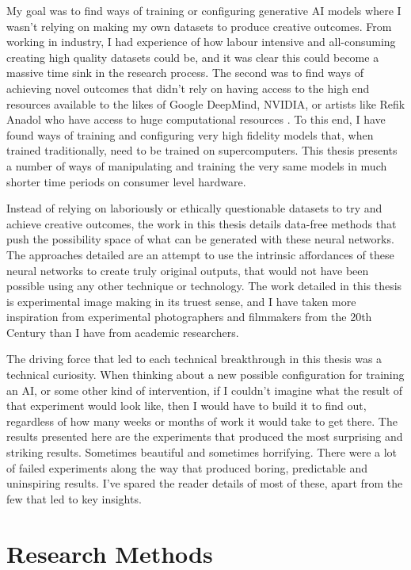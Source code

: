 My goal was to find ways of training or configuring generative AI models where I wasn’t relying on making my own datasets to produce creative outcomes. 
From working in industry, I had experience of how labour intensive and all-consuming creating high quality datasets could be, and it was clear this could become a massive time sink in the research process. 
The second was to find ways of achieving novel outcomes that didn’t rely on having access to the high end resources available to the likes of Google DeepMind, NVIDIA, or artists like Refik Anadol who have access to huge computational resources \citep{caulfield2022refik}. 
To this end, I have found ways of training and configuring very high fidelity models that, when trained traditionally, need to be trained on supercomputers. 
This thesis presents a number of ways of manipulating and training the very same models in much shorter time periods on consumer level hardware. 

Instead of relying on laboriously or ethically questionable datasets to try and achieve creative outcomes, the work in this thesis details data-free methods that push the possibility space of what can be generated with these neural networks. 
The approaches detailed are an attempt to use the intrinsic affordances of these neural networks to create truly original outputs, that would not have been possible using any other technique or technology. 
The work detailed in this thesis is experimental image making in its truest sense, and I have taken more inspiration from experimental photographers and filmmakers from the 20th Century than I have from academic researchers.

The driving force that led to each technical breakthrough in this thesis was a technical curiosity. 
When thinking about a new possible configuration for training an AI, or some other kind of intervention, if I couldn’t imagine what the result of that experiment would look like, then I would have to build it to find out, regardless of how many weeks or months of work it would take to get there. 
The results presented here are the experiments that produced the most surprising and striking results. 
Sometimes beautiful and sometimes horrifying. 
There were a lot of failed experiments along the way that produced boring, predictable and uninspiring results. 
I’ve spared the reader details of most of these, apart from the few that led to key insights.

\section{Research Methods}

